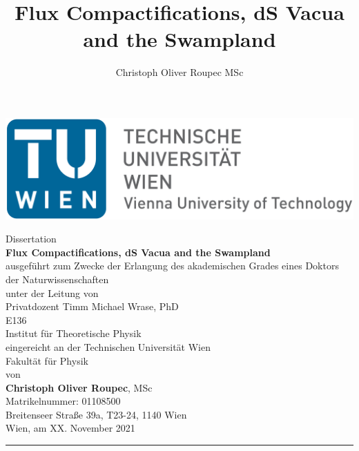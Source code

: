 \documentclass[a4paper,12pt,twoside,openright]{report}
\title{Flux Compactifications, dS Vacua and the Swampland}
\author{Christoph Oliver Roupec MSc}
\begin{document}
\pagestyle{myplain}
\setlength{\parindent}{0pt}
\renewcommand{\arraystretch}{1.2} %


\setcounter{page}{0}

{\thispagestyle{empty}
\includegraphics[scale=0.08]{TU_Logo.png}
\vspace{12pt}
\begin{center}
{\large
Dissertation\vspace{12pt}\\
{\Large\textbf{Flux Compactifications, dS Vacua and the Swampland}}\vspace{12pt}\\
ausgeführt zum Zwecke der Erlangung des akademischen Grades eines Doktors der Naturwissenschaften\vspace{12pt}\\
unter der Leitung von\vspace{12pt}\\
Privatdozent Timm Michael Wrase, PhD\\
E136\\
Institut für Theoretische Physik\vspace{12pt}\\
eingereicht an der Technischen Universität Wien\\
Fakultät für Physik\vspace{12pt}\\
von\vspace{12pt}\\
{\Large\textbf{Christoph Oliver Roupec}, MSc}\\
Matrikelnummer: 01108500\vspace{12pt}\\
Breitenseer Straße 39a, T23-24, 1140 Wien\vspace{90pt}\\
Wien, am XX. November 2021 \hspace{\fill}\rule{0.33 \textwidth}{0.5pt}
}
\end{center}
}
\end{document}
